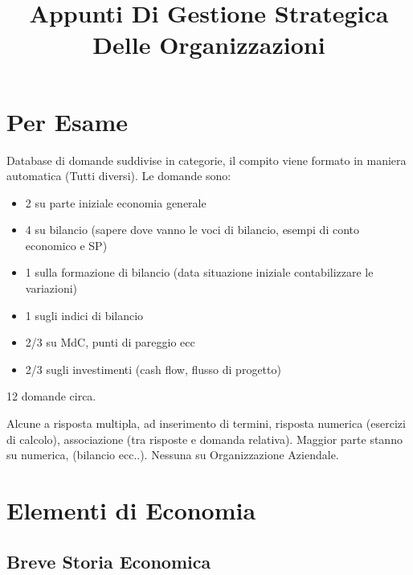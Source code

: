 \documentclass[a4paper,portrait,12pt]{article}
\theoremstyle{definition}
\begin{document}
\title{Appunti Di Gestione Strategica Delle Organizzazioni}

\maketitle
\date
\newpage

\tableofcontents



\newpage
\section{Per Esame}



Database di domande suddivise in categorie, il compito viene formato in maniera automatica (Tutti diversi).
Le domande sono:
\begin{itemize}
\item 2 su parte iniziale economia generale
\item 4 su bilancio (sapere dove vanno le voci di bilancio, esempi di conto economico e SP)
\item 1 sulla formazione di bilancio (data situazione iniziale contabilizzare le variazioni)
\item 1 sugli indici di bilancio
\item 2/3 su MdC, punti di pareggio ecc
\item 2/3 sugli investimenti (cash flow, flusso di progetto)
\end{itemize}

12 domande circa.

Alcune a risposta multipla, ad inserimento di termini, risposta numerica (esercizi di calcolo), associazione (tra risposte e domanda relativa).
Maggior parte stanno su numerica, (bilancio ecc..).
Nessuna su Organizzazione Aziendale.



\newpage
\section{Elementi di Economia}


\subsection{Breve Storia Economica}
\end{document}
